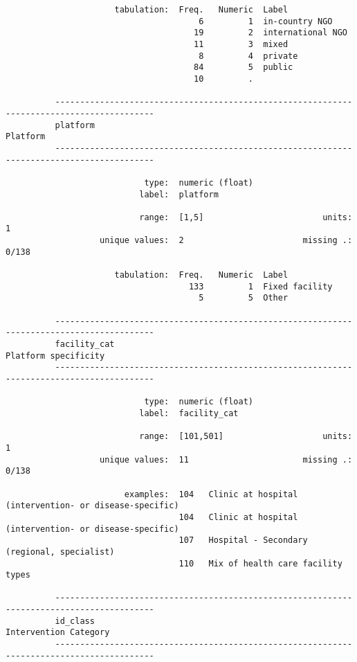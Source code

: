 \documentclass{article}
\begin{document}
\begin{verbatim}
                      tabulation:  Freq.   Numeric  Label
                                       6         1  in-country NGO
                                      19         2  international NGO
                                      11         3  mixed
                                       8         4  private
                                      84         5  public
                                      10         .  
          
          ------------------------------------------------------------------------------------------
          platform                                                                          Platform
          ------------------------------------------------------------------------------------------
          
                            type:  numeric (float)
                           label:  platform
          
                           range:  [1,5]                        units:  1
                   unique values:  2                        missing .:  0/138
          
                      tabulation:  Freq.   Numeric  Label
                                     133         1  Fixed facility
                                       5         5  Other
          
          ------------------------------------------------------------------------------------------
          facility_cat                                                          Platform specificity
          ------------------------------------------------------------------------------------------
          
                            type:  numeric (float)
                           label:  facility_cat
          
                           range:  [101,501]                    units:  1
                   unique values:  11                       missing .:  0/138
          
                        examples:  104   Clinic at hospital (intervention- or disease-specific)
                                   104   Clinic at hospital (intervention- or disease-specific)
                                   107   Hospital - Secondary (regional, specialist)
                                   110   Mix of health care facility types
          
          ------------------------------------------------------------------------------------------
          id_class                                                             Intervention Category
          ------------------------------------------------------------------------------------------
          

\end{verbatim}
\end{document}
